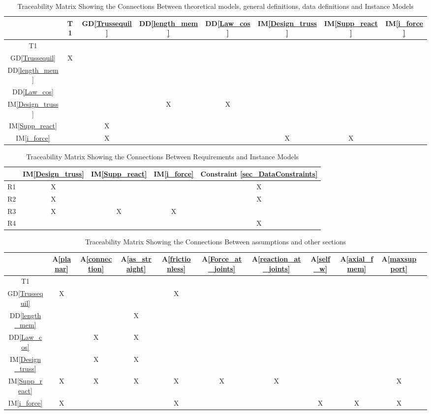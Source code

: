 \documentclass[12pt]{article}
\newcommand{\dref}[1]{GD\ref{#1}}
\newcommand{\ddref}[1]{DD\ref{#1}}
\newcommand{\aref}[1]{A\ref{#1}}
\newcommand{\iref}[1]{IM\ref{#1}}
\begin{document}
\begin{table}[h!]
\centering
\begin{tabular}{|c|c|c|c|c|c|c|c|}
\hline
	& T1& \dref{Trussequil}& \ddref{length_mem}  
  & \ddref{Law_cos} &\iref{Design_truss}& \iref{Supp_react}& 
	\iref{i_force}  \\
\hline
T1       & & & & & & &\\ \hline
\dref{Trussequil}    &X & & & & & &\\ \hline
\ddref{length_mem}    & & & & & & &\\ \hline
\ddref{Law_cos}       & & & & & & &\\ \hline
\iref{Design_truss} & & &X &X & & &\\ \hline 
\iref{Supp_react} & &X & & & & &\\ \hline 
\iref{i_force} & &X & & &X &X &\\ \hline 
\end{tabular}
\caption{Traceability Matrix Showing the Connections Between  theoretical models, general definitions,
data definitions and Instance Models}
\label{Table:trace}
\end{table}
\begin{table}[h!]
\centering
\begin{tabular}{|c|c|c|c|c|}
\hline
	& \iref{Design_truss}& \iref{Supp_react}& 
	\iref{i_force}& Constraint \ref{sec_DataConstraints}  \\
\hline
R1      &X & & &X\\ \hline
R2    &X & &  &X\\ \hline
R3    &X &X &X&\\ \hline
R4       & & & &X\\ \hline
\end{tabular}
\caption{Traceability Matrix Showing the Connections Between Requirements and Instance Models}
\label{Table:R_trace}
\end{table}
\begin{table}[h!]
\centering
\begin{tabular}{|c|c|c|c|c|c|c|c|c|c|c|}
\hline
	& \aref{planar}& \aref{connection}& \aref{as_straight}  &\aref{frictionless} & \aref{Force_at_joints} & \aref{reaction_at_joints} & \aref{self_w} 
 & \aref{axial_fmem} &\aref{maxsupport}\\
\hline
T1      & & & & & & & & & \\ \hline
\dref{Trussequil}      &X & & &X & & & & & \\ \hline
\ddref{length_mem}      & & &X & & & & & & \\ \hline
\ddref{Law_cos}      & &X &X & & & & & & \\ \hline
\iref{Design_truss}      & &X &X & & & & & & \\ \hline
\iref{Supp_react}      &X &X &X &X &X &X & & &X \\ \hline
\iref{i_force}      &X & & &X & & &X &X &X \\ \hline
\end{tabular}
\caption{Traceability Matrix Showing the Connections Between assumptions and other sections}
\label{Table:A_trace}
\end{table}
\end{document}
